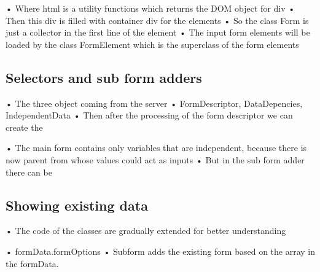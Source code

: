
•	Where html is a utility functions which returns the DOM object for div
•	Then this div is filled with container div for the elements
•	So the class Form is just a collector in the first line of the element
•	The input form elements will be loaded by the class FormElement which is the superclass of the form elements



\subsection{Selectors and sub form adders}

•	The three object coming from the server
•	FormDescriptor, DataDepencies, IndependentData
•	Then after the processing of the form descriptor we can create the 



•	The main form contains only variables that are independent, because there is now parent from whose values could act as inputs
•	But in the sub form adder there can be 



\subsection{Showing existing data}

•	The code of the classes are gradually extended for better understanding


•	formData.formOptions
•	Subform adds the existing form based on the array in the formData. 


